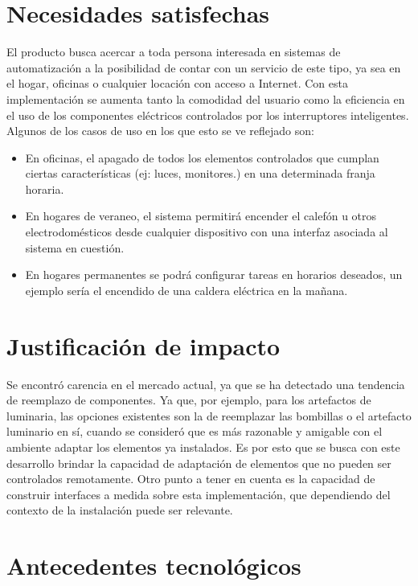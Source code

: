 \section{Necesidades satisfechas}
El producto busca acercar a toda persona interesada en sistemas de automatización a la posibilidad de contar con un servicio de este tipo, ya sea en el hogar, oficinas o cualquier locación con acceso a Internet.
Con esta implementación se aumenta tanto la comodidad del usuario como la eficiencia en el uso de los componentes eléctricos controlados por los interruptores inteligentes. Algunos de los casos de uso en los que esto se ve reflejado son:

\begin{itemize}
	\item En oficinas, el apagado de todos los elementos controlados que cumplan ciertas características (ej: luces, monitores.) en una determinada franja horaria.
	\item En hogares de veraneo, el sistema permitirá encender el calefón u otros electrodomésticos desde cualquier dispositivo con una interfaz asociada al sistema en cuestión.
	\item En hogares permanentes se podrá configurar tareas en horarios deseados, un ejemplo sería el encendido de una caldera eléctrica en la mañana.
\end{itemize}

\section{Justificación de impacto}

Se encontró carencia en el mercado actual, ya que se ha detectado una tendencia de reemplazo de componentes. Ya que, por ejemplo, para los artefactos de luminaria, las opciones existentes son la de reemplazar las bombillas o el artefacto luminario en sí, cuando se consideró que es más razonable y amigable con el ambiente adaptar los elementos ya instalados. Es por esto que se busca con este desarrollo brindar la capacidad de adaptación de elementos que no pueden ser controlados remotamente.
Otro punto a tener en cuenta es la capacidad de construir interfaces a medida sobre esta implementación, que dependiendo del contexto de la instalación puede ser relevante.

\section{Antecedentes tecnológicos}

